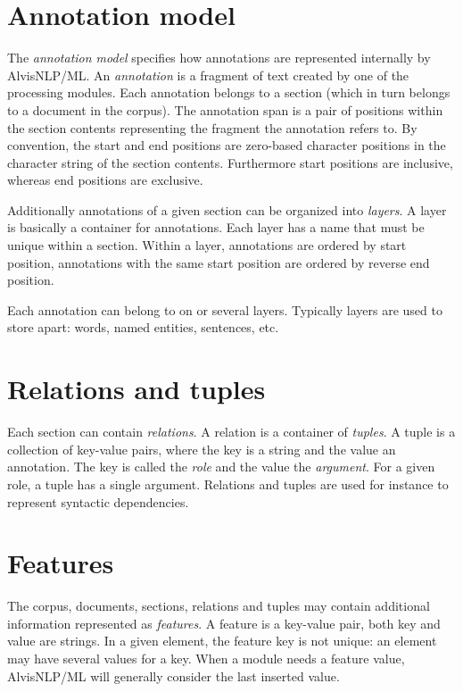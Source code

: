 \documentclass[a4paper]{book}
\begin{document}
\section{Annotation model}
\label{AnnotationModel}
The \emph{annotation model} specifies how annotations are represented internally by AlvisNLP/ML.
An \emph{annotation} is a fragment of text created by one of the processing modules.
Each annotation belongs to a section (which in turn belongs to a document in the corpus).
The annotation span is a pair of positions within the section contents representing the fragment the annotation refers to.
By convention, the start and end positions are zero-based character positions in the character string of the section contents.
Furthermore start positions are inclusive, whereas end positions are exclusive.

Additionally annotations of a given section can be organized into \emph{layers}.
A layer is basically a container for annotations.
Each layer has a name that must be unique within a section.
Within a layer, annotations are ordered by start position, annotations with the same start position are ordered by reverse end position.

Each annotation can belong to on or several layers.
Typically layers are used to store apart: words, named entities, sentences, etc.

\section{Relations and tuples}
\label{RelationsAndTuples}
Each section can contain \emph{relations}.
A relation is a container of \emph{tuples}.
A tuple is a collection of key-value pairs, where the key is a string and the value an annotation.
The key is called the \emph{role} and the value the \emph{argument}.
For a given role, a tuple has a single argument.
Relations and tuples are used for instance to represent syntactic dependencies.

\section{Features}
The corpus, documents, sections, relations and tuples may contain additional information represented as \emph{features}.
A feature is a key-value pair, both key and value are strings.
In a given element, the feature key is not unique: an element may have several values for a key.
When a module needs a feature value, AlvisNLP/ML will generally consider the last inserted value.
\end{document}
